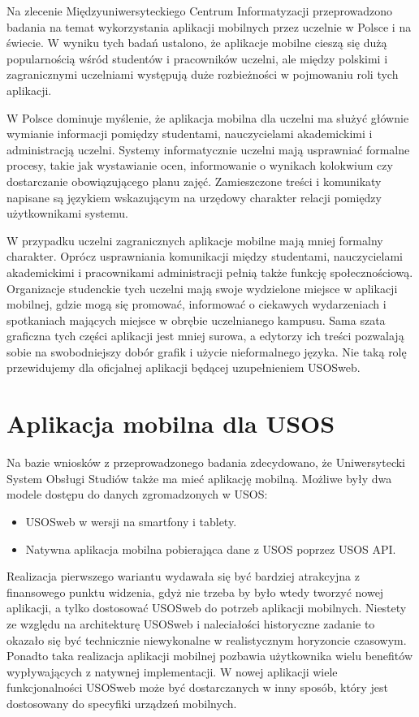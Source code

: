 \documentclass{pracamgr}
\begin{document}
Na zlecenie Międzyuniwersyteckiego Centrum Informatyzacji przeprowadzono
badania na temat wykorzystania aplikacji mobilnych przez uczelnie w
Polsce i na świecie. W wyniku tych badań ustalono, że aplikacje mobilne
cieszą się dużą popularnością wśród studentów i pracowników uczelni, ale
między polskimi i zagranicznymi uczelniami występują duże rozbieżności w
pojmowaniu roli tych aplikacji.

W Polsce dominuje myślenie, że aplikacja mobilna dla uczelni ma służyć głównie
wymianie informacji pomiędzy studentami, nauczycielami akademickimi i administracją
uczelni. Systemy informatycznie uczelni mają usprawniać formalne procesy, takie jak
wystawianie ocen, informowanie o wynikach kolokwium czy dostarczanie obowiązującego
planu zajęć. Zamieszczone treści i komunikaty napisane są językiem wskazującym na
urzędowy charakter relacji pomiędzy użytkownikami systemu.

W przypadku uczelni zagranicznych aplikacje mobilne mają mniej formalny
charakter. Oprócz usprawniania komunikacji między studentami, nauczycielami
akademickimi i pracownikami administracji pełnią także funkcję społecznościową.
Organizacje studenckie tych uczelni mają swoje wydzielone miejsce w aplikacji
mobilnej, gdzie mogą się promować, informować o ciekawych wydarzeniach i spotkaniach
mających miejsce w obrębie uczelnianego kampusu. Sama szata graficzna tych części
aplikacji jest mniej surowa, a edytorzy ich treści pozwalają sobie na
swobodniejszy dobór grafik i użycie nieformalnego języka. Nie taką rolę
przewidujemy dla oficjalnej aplikacji będącej uzupełnieniem USOSweb.

\section{Aplikacja mobilna dla USOS}

Na bazie wniosków z przeprowadzonego badania zdecydowano, że Uniwersytecki
System Obsługi Studiów także ma mieć aplikację mobilną. Możliwe były dwa
modele dostępu do danych zgromadzonych w USOS:

\begin{itemize}
	\item USOSweb w wersji na smartfony i tablety.
	\item Natywna aplikacja mobilna pobierająca dane z USOS poprzez USOS API.
\end{itemize}

Realizacja pierwszego wariantu wydawała się być bardziej atrakcyjna z finansowego
punktu widzenia, gdyż nie trzeba by było wtedy tworzyć nowej aplikacji, a tylko
dostosować USOSweb do potrzeb aplikacji mobilnych. Niestety ze względu na architekturę
USOSweb i naleciałości historyczne zadanie to okazało się być technicznie niewykonalne
w realistycznym horyzoncie czasowym. Ponadto taka realizacja aplikacji mobilnej
pozbawia użytkownika wielu benefitów wypływających z natywnej implementacji.
W nowej aplikacji wiele funkcjonalności USOSweb może być dostarczanych w inny
sposób, który jest dostosowany do specyfiki urządzeń mobilnych.
\end{document}
